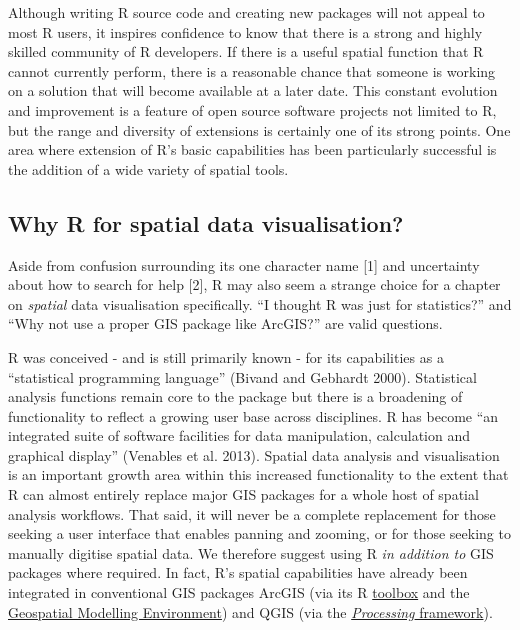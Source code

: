 \documentclass[]{article}
\begin{document}
Although writing R source code and creating new packages will not appeal
to most R users, it inspires confidence to know that there is a strong
and highly skilled community of R developers. If there is a useful
spatial function that R cannot currently perform, there is a reasonable
chance that someone is working on a solution that will become available
at a later date. This constant evolution and improvement is a feature of
open source software projects not limited to R, but the range and
diversity of extensions is certainly one of its strong points. One area
where extension of R's basic capabilities has been particularly
successful is the addition of a wide variety of spatial tools.

\subsection{Why R for spatial data visualisation?}

Aside from confusion surrounding its one character name {[}1{]} and
uncertainty about how to search for help {[}2{]}, R may also seem a
strange choice for a chapter on \emph{spatial} data visualisation
specifically. ``I thought R was just for statistics?'' and ``Why not use
a proper GIS package like ArcGIS?'' are valid questions.

R was conceived - and is still primarily known - for its capabilities as
a ``statistical programming language'' (Bivand and Gebhardt 2000).
Statistical analysis functions remain core to the package but there is a
broadening of functionality to reflect a growing user base across
disciplines. R has become ``an integrated suite of software facilities
for data manipulation, calculation and graphical display'' (Venables et
al. 2013). Spatial data analysis and visualisation is an important
growth area within this increased functionality to the extent that R can
almost entirely replace major GIS packages for a whole host of spatial
analysis workflows. That said, it will never be a complete replacement
for those seeking a user interface that enables panning and zooming, or
for those seeking to manually digitise spatial data. We therefore
suggest using R \emph{in addition to} GIS packages where required. In
fact, R's spatial capabilities have already been integrated in
conventional GIS packages ArcGIS (via its R
\href{http://www.arcgis.com/home/item.html?id=a5736544d97a4544aa47d06baf910f6d}{toolbox}
and the \href{http://www.spatialecology.com/gme/}{Geospatial Modelling
Environment}) and QGIS (via the
\href{http://qgis.org/en/docs/user\_manual/processing/3rdParty.html}{\emph{Processing}
framework}).
\end{document}

